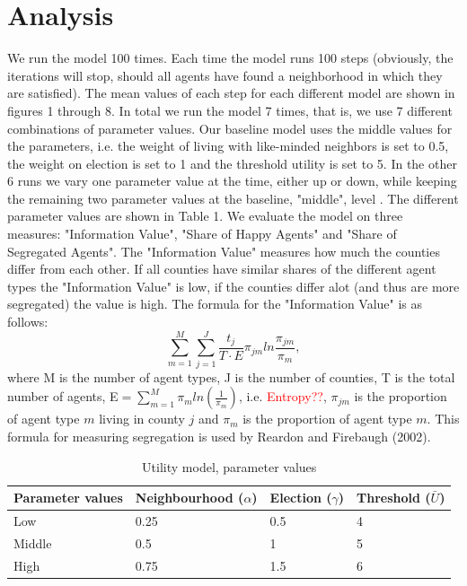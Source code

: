 \documentclass[12pt, a4paper]{article}
\begin{document}
\section{\label{sec_res}Analysis}
We run the model 100 times. Each time the model runs 100 steps (obviously, the iterations will stop, should all agents have found a neighborhood in which they are satisfied). The mean values of each step for each different model are shown in figures 1 through 8. In total we run the model 7 times, that is, we use 7 different combinations of parameter values. Our baseline model uses the middle values for the parameters, i.e. the weight of living with like-minded neighbors is set to 0.5, the weight on election is set to 1 and the threshold utility is set to 5. In the other 6 runs we vary one parameter value at the time, either up or down, while keeping the remaining two parameter values at the baseline, "middle", level %
. The different parameter values are shown in Table 1. We evaluate the model on three measures: "Information Value", "Share of Happy Agents" and "Share of Segregated Agents". The "Information Value" measures how much the counties differ from each other. If all counties have similar shares of the different agent types the "Information Value" is low, if the counties differ alot (and thus are more segregated) the value is high. The formula for the "Information Value" is as follows: \newline \newline
$$\sum_{m=1}^{M}\sum_{j=1}^{J}\frac{t_j}{T \cdot E}\pi_{jm}ln\frac{\pi_{jm}}{\pi_m},$$ where M is the number of agent types, J is the number of counties, T is the total number of agents, E$=\sum_{m=1}^{M}\pi_m ln(\frac{1}{\pi_m})$, i.e. \textcolor{red}{Entropy??}, $\pi_{jm}$ is the proportion of agent type $m$ living in county $j$ and $\pi_m$ is the proportion of agent type $m$. This formula for measuring segregation is used by Reardon and Firebaugh (2002). %

\begin{table}[ht]
	\centering
	\caption{Utility model, parameter values}
	\begin{tabular}{llll}
		\hline
		Parameter values & Neighbourhood ($\alpha$) & Election ($\gamma$) & Threshold ($\bar{U}$) \\ 
		\hline \hline
		Low & 0.25 & 0.5 & 4 \\ 
		Middle & 0.5 & 1 & 5 \\ 
		High & 0.75 & 1.5 & 6 \\ \hline
		\hline
	\end{tabular}
\end{table}
\end{document}
